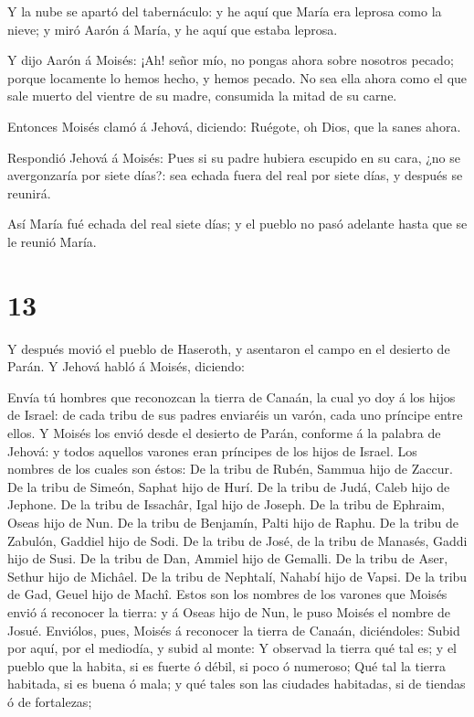  Y la nube se apartó del tabernáculo: y he aquí que María
era leprosa como la nieve; y miró Aarón á María, y he aquí que estaba
leprosa.

 Y dijo Aarón á Moisés: ¡Ah! señor mío, no pongas ahora
sobre nosotros pecado; porque locamente lo hemos hecho, y hemos pecado.
 No sea ella ahora como el que sale muerto del vientre de
su madre, consumida la mitad de su carne.

 Entonces Moisés clamó á Jehová, diciendo: Ruégote, oh
Dios, que la sanes ahora.

 Respondió Jehová á Moisés: Pues si su padre hubiera
escupido en su cara, ¿no se avergonzaría por siete días?: sea echada
fuera del real por siete días, y después se reunirá.

 Así María fué echada del real siete días; y el pueblo no
pasó adelante hasta que se le reunió María. 

\hypertarget{section-12}{%
\section{13}\label{section-12}}

 Y después movió el pueblo de Haseroth, y asentaron el campo
en el desierto de Parán.  Y Jehová habló á Moisés, diciendo:

 Envía tú hombres que reconozcan la tierra de Canaán, la
cual yo doy á los hijos de Israel: de cada tribu de sus padres enviaréis
un varón, cada uno príncipe entre ellos.  Y Moisés los envió
desde el desierto de Parán, conforme á la palabra de Jehová: y todos
aquellos varones eran príncipes de los hijos de Israel.  Los
nombres de los cuales son éstos: De la tribu de Rubén, Sammua hijo de
Zaccur.  De la tribu de Simeón, Saphat hijo de Hurí.
 De la tribu de Judá, Caleb hijo de Jephone.  De
la tribu de Issachâr, Igal hijo de Joseph.  De la tribu de
Ephraim, Oseas hijo de Nun.  De la tribu de Benjamín, Palti
hijo de Raphu.  De la tribu de Zabulón, Gaddiel hijo de
Sodi.  De la tribu de José, de la tribu de Manasés, Gaddi
hijo de Susi.  De la tribu de Dan, Ammiel hijo de Gemalli.
 De la tribu de Aser, Sethur hijo de Michâel. 
De la tribu de Nephtalí, Nahabí hijo de Vapsi.  De la tribu
de Gad, Geuel hijo de Machî.  Estos son los nombres de los
varones que Moisés envió á reconocer la tierra: y á Oseas hijo de Nun,
le puso Moisés el nombre de Josué.  Enviólos, pues, Moisés
á reconocer la tierra de Canaán, diciéndoles: Subid por aquí, por el
mediodía, y subid al monte:  Y observad la tierra qué tal
es; y el pueblo que la habita, si es fuerte ó débil, si poco ó numeroso;
 Qué tal la tierra habitada, si es buena ó mala; y qué
tales son las ciudades habitadas, si de tiendas ó de fortalezas;

